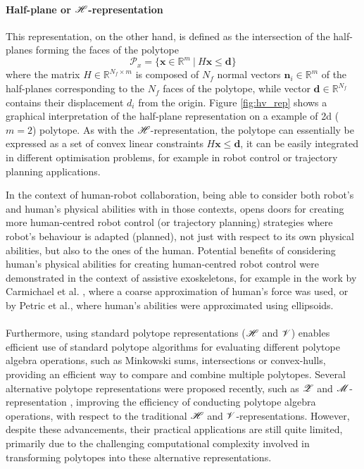 \paragraph*{Half-plane or $\mathscr{H}$-representation}
This representation, on the other hand, is defined as the intersection of the half-planes forming the faces of the polytope
\begin{equation}
  \mathcal{P}_x = \{\bm{x} \in \mathbb{R}^m~ |~ H\bm{x} \leq \bm{d} \}
\end{equation} 
where the matrix $H \in \mathbb{R}^{N_f\times m }$ is composed of $N_f$ normal vectors $\bm{n}_i\in\mathbb
{R}^m$ of the half-planes corresponding to the $N_f$ faces of the polytope, while vector $\bm{d}\in \mathbb{R}^{N_f}$ contains their displacement $d_i$ from the origin. Figure \ref{fig:hv_rep} shows a graphical interpretation of the half-plane representation on a example of 2d ($m\!=\!2$) polytope. As with the $\mathscr{H}$-representation, the polytope can essentially be expressed as a set of convex linear constraints $H\bm{x}\leq\bm{d}$, it can be easily integrated in different optimisation problems, for example in robot control or trajectory planning applications. 

In the context of human-robot collaboration, being able to consider both robot's and human's physical abilities with in those contexts, opens doors for creating more human-centred robot control (or trajectory planning) strategies where robot's behaviour is adapted (planned), not just with respect to its own physical abilities, but also to the ones of the human.
Potential benefits of considering human's physical abilities for creating human-centred robot control were demonstrated in the context of assistive exoskeletons, for example in the work by Carmichael et al. \cite{carmichael_towards_2011} , where a coarse approximation of human's force was used, or by Petric et al.\cite{petric2019assistive}, where human's abilities were approximated using ellipsoids.

\paragraph*{} Furthermore, using standard polytope representations ($\mathscr{H}$ and $\mathscr{V}$) enables efficient use of standard polytope algorithms for evaluating different polytope algebra operations, such as Minkowski sums,  intersections or convex-hulls, providing an efficient way to compare and combine multiple polytopes. Several alternative polytope representations were proposed recently, such as $\mathscr{Z}$ \cite{kochdumper2019representation} and $\mathscr{M}$-representation \cite{sigl2023mrepresentation}, improving the efficiency of conducting polytope algebra operations, with respect to the traditional $\mathscr{H}$ and $\mathscr{V}$-representations. However, despite these advancements, their practical applications are still quite limited, primarily due to the challenging computational complexity involved in transforming polytopes into these alternative representations. 


